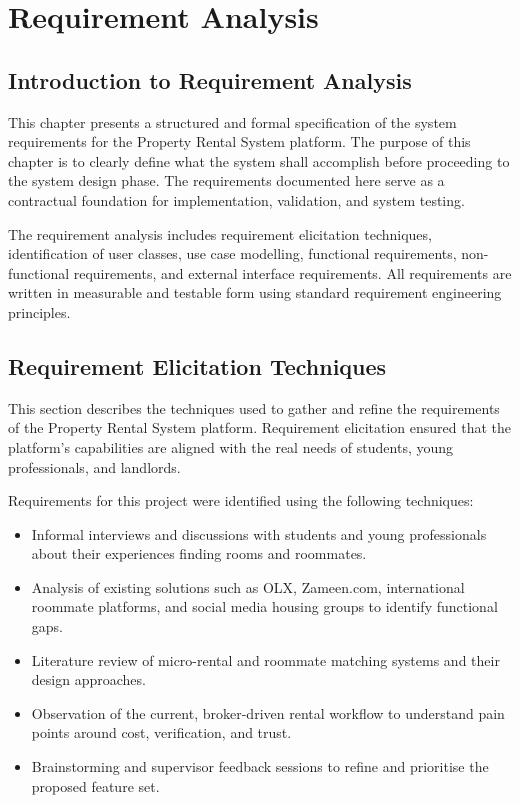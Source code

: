 
\chapter{Requirement Analysis}

\section{Introduction to Requirement Analysis}

This chapter presents a structured and formal specification of the system requirements for the Property Rental System platform. The purpose of this chapter is to clearly define what the system shall accomplish before proceeding to the system design phase. The requirements documented here serve as a contractual foundation for implementation, validation, and system testing.

The requirement analysis includes requirement elicitation techniques, identification of user classes, use case modelling, functional requirements, non-functional requirements, and external interface requirements. All requirements are written in measurable and testable form using standard requirement engineering principles.

\section{Requirement Elicitation Techniques}

This section describes the techniques used to gather and refine the requirements of the Property Rental System platform. Requirement elicitation ensured that the platform's capabilities are aligned with the real needs of students, young professionals, and landlords.

Requirements for this project were identified using the following techniques:

\begin{itemize}
    \item Informal interviews and discussions with students and young professionals about their experiences finding rooms and roommates.
    \item Analysis of existing solutions such as OLX, Zameen.com, international roommate platforms, and social media housing groups to identify functional gaps.
    \item Literature review of micro-rental and roommate matching systems and their design approaches.
    \item Observation of the current, broker-driven rental workflow to understand pain points around cost, verification, and trust.
    \item Brainstorming and supervisor feedback sessions to refine and prioritise the proposed feature set.
\end{itemize}

